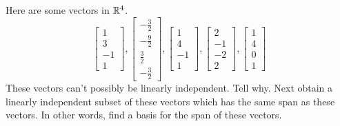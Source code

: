 \documentclass{ximera}
\begin{document}
\begin{problem}\label{prb:3.30} Here are some vectors in $\mathbb{R}^{4}$.
\begin{equation*}
\left[
\begin{array}{r}
1 \\
3 \\
-1 \\
1
\end{array}
\right] ,\left[
\begin{array}{r}
-\frac{3}{2} \\
-\frac{9}{2} \\
\frac{3}{2} \\
-\frac{3}{2}
\end{array}
\right] ,\left[
\begin{array}{r}
1 \\
4 \\
-1 \\
1
\end{array}
\right] ,\left[
\begin{array}{r}
2 \\
-1 \\
-2 \\
2
\end{array}
\right] ,\left[
\begin{array}{r}
1 \\
4 \\
0 \\
1
\end{array}
\right]
\end{equation*}
These vectors can't possibly be linearly independent. Tell why. Next obtain a
linearly independent subset of these vectors which has the same span as
these vectors. In other words, find a basis for the span of these vectors.
\end{problem}
\end{document}
